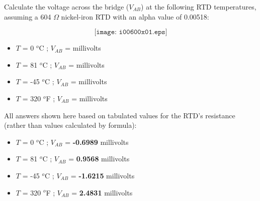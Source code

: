 

Calculate the voltage across the bridge ($V_{AB}$) at the following RTD temperatures, assuming a 604 $\Omega$ nickel-iron RTD with an alpha value of 0.00518:

$$\texttt{[image: i00600x01.eps]}$$

\begin{itemize}
\item{} $T$ = 0 $^{o}$C ; $V_{AB}$ = \underbar{\hskip 50pt} millivolts
\vskip 10pt
\item{} $T$ = 81 $^{o}$C ; $V_{AB}$ = \underbar{\hskip 50pt} millivolts 
\vskip 10pt
\item{} $T$ = -45 $^{o}$C ; $V_{AB}$ = \underbar{\hskip 50pt} millivolts 
\vskip 10pt
\item{} $T$ = 320 $^{o}$F ; $V_{AB}$ = \underbar{\hskip 50pt} millivolts 
\end{itemize}








All answers shown here based on tabulated values for the RTD's resistance (rather than values calculated by formula):

\begin{itemize}
\item{} $T$ = 0 $^{o}$C ; $V_{AB}$ = {\bf -0.6989} millivolts
\vskip 10pt
\item{} $T$ = 81 $^{o}$C ; $V_{AB}$ = {\bf 0.9568} millivolts 
\vskip 10pt
\item{} $T$ = -45 $^{o}$C ; $V_{AB}$ = {\bf -1.6215} millivolts 
\vskip 10pt
\item{} $T$ = 320 $^{o}$F ; $V_{AB}$ = {\bf 2.4831} millivolts 
\end{itemize}











